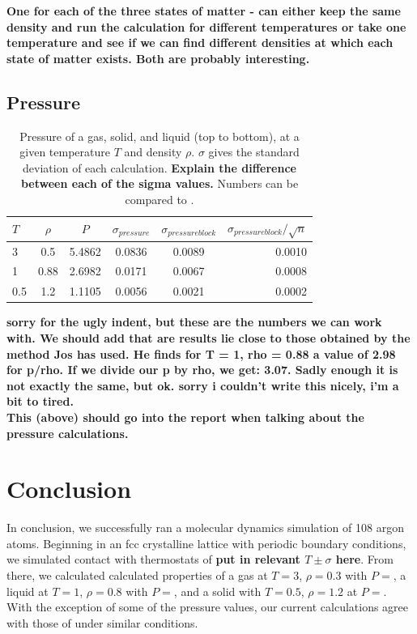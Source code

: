 \documentclass{article}
\begin{document}
\begin{multicols}{2}
\textbf{One for each of the three states of matter - can either keep the same density and run the calculation for different temperatures or take one temperature and see if we can find different densities at which each state of matter exists.  Both are probably interesting.}

\subsection{Pressure}

\begin{table}
\begin{center}
\begin{tabular}{| l | c | c | c | c | r |}
\hline  $T$ & $\rho$ & $P$ & $\sigma_{pressure}$ & $\sigma_{pressureblock}$ & $\sigma_{pressureblock}/ \sqrt n$ \\ \hline
  3 & 0.5 & 5.4862 & 0.0836 & 0.0089 & 0.0010 \\ \hline
  1 & 0.88 & 2.6982 & 0.0171 & 0.0067 & 0.0008 \\ \hline
  0.5 & 1.2 & 1.1105 & 0.0056 & 0.0021 & 0.0002 \\ \hline
\end{tabular}
\label{pressuretab}
\caption{Pressure of a gas, solid, and liquid (top to bottom), at a given temperature $T$ and density $\rho$.  $\sigma$ gives the standard deviation of each calculation.  \textbf{Explain the difference between each of the sigma values.}  Numbers can be compared to \cite{thijssen}.}
\end{center}
\end{table}

\textbf{sorry for the ugly indent, but these are the numbers we can work with. We should add that are results lie close to those obtained by the method Jos has used. He finds for T = 1, rho = 0.88 a value of 2.98 for p/rho. If we divide our p by rho, we get: 3.07. Sadly enough it is not exactly the same, but ok. sorry i couldn't write this nicely, i'm a bit to tired.}\\

\textbf{This (above) should go into the report when talking about the pressure calculations.}

\section{Conclusion}
\label{conc}

In conclusion, we successfully ran a molecular dynamics simulation of 108 argon atoms.  Beginning in an fcc crystalline lattice with periodic boundary conditions, we simulated contact with thermostats of \textbf{put in relevant $T\pm \sigma$ here}.  From there, we calculated calculated properties of a gas at $T=3$, $\rho=0.3$ with $P=$, a liquid at $T=1$, $\rho =0.8$ with $P=$, and a solid with $T=0.5$, $\rho=1.2$ at $P=$.  With the exception of some of the pressure values, our current calculations agree with those of \cite{thijssen} under similar conditions.  \\


\end{multicols}
\end{document}
